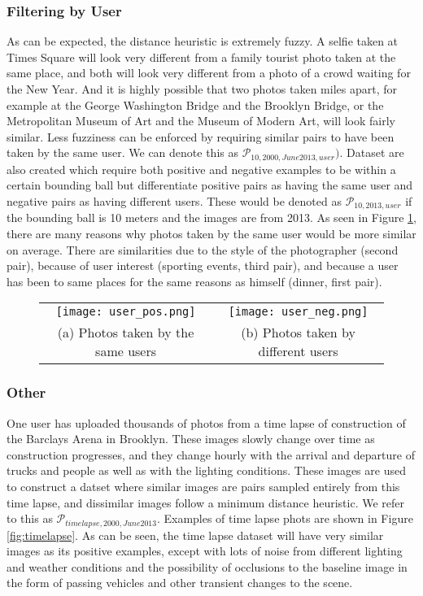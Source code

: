 \subsubsection{Filtering by User}
As can be expected, the distance heuristic is extremely fuzzy. A selfie taken at Times Square will look very different from a family tourist photo taken at the same place, and both will look very different from a photo of a crowd waiting for the New Year. And it is highly possible that two photos taken miles apart, for example at the George Washington Bridge and the Brooklyn Bridge, or the Metropolitan Museum of Art and the Museum of Modern Art, will look fairly similar. Less fuzziness can be enforced by requiring similar pairs to have been taken by the same user. We can denote this as $\mathcal{P}_{10,2000,June2013,user})$. Dataset are also created which require both positive and negative examples to be within a certain bounding ball but differentiate positive pairs as having the same user and negative pairs as having different users. These would be denoted as $\mathcal{P}_{10,2013,user}$ if the bounding ball is 10 meters and the images are from 2013. As seen in Figure \ref{fig:users}, there are many reasons why photos taken by the same user would be more similar on average. There are similarities due to the style of the photographer (second pair), because of user interest (sporting events, third pair), and because a user has been to same places for the same reasons as himself (dinner, first pair). 
\begin{figure}[!htbp]
	\centering
	\begin{tabular}{cc}
		\texttt{[image: user\_pos.png]}  &       \texttt{[image: user\_neg.png]}  \\
							(a) Photos taken by the same users & (b) Photos taken by different users\\[6pt]
	\end{tabular}
	\caption{}
	\label{fig:users}
\end{figure}


\subsubsection{Other}
One user has uploaded thousands of photos from a time lapse of construction of the Barclays Arena in Brooklyn. These images slowly change over time as construction progresses, and they change hourly with the arrival and departure of trucks and people as well as with the lighting conditions. These images are used to construct a datset where similar images are pairs sampled entirely from this time lapse, and dissimilar images follow a minimum distance heuristic. We refer to this as $\mathcal{P}_{timelapse,2000,June2013}$. Examples of time lapse phots are shown in Figure \ref{fig:timelapse}. As can be seen, the time lapse dataset will have very similar images as its positive examples, except with lots of noise from different lighting and weather conditions and the possibility of occlusions to the baseline image in the form of passing vehicles and other transient changes to the scene. 
	
